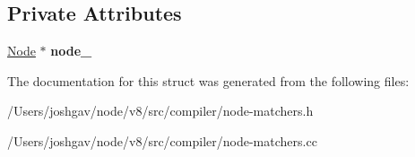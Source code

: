 \subsection*{Private Attributes}
\begin{DoxyCompactItemize}
\item 
\hyperlink{classv8_1_1internal_1_1compiler_1_1_node}{Node} $\ast$ {\bfseries node\+\_\+}\hypertarget{structv8_1_1internal_1_1compiler_1_1_node_matcher_ad8711b38e0bf6d47046428f5d86c1d0f}{}\label{structv8_1_1internal_1_1compiler_1_1_node_matcher_ad8711b38e0bf6d47046428f5d86c1d0f}

\end{DoxyCompactItemize}


The documentation for this struct was generated from the following files\+:\begin{DoxyCompactItemize}
\item 
/\+Users/joshgav/node/v8/src/compiler/node-\/matchers.\+h\item 
/\+Users/joshgav/node/v8/src/compiler/node-\/matchers.\+cc\end{DoxyCompactItemize}
